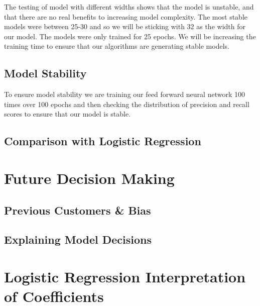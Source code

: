 \documentclass[12pt]{article}
\begin{document}
	The testing of model with different widths shows that the model is unstable, and that there are no real benefits to increasing model complexity. The most stable models were between 25-30 and so we will be sticking with 32 as the width for our model. The models were only trained for 25 epochs. We will be increasing the training time to ensure that our algorithms are generating stable models. 
	
	\subsection{Model Stability}
	
	To ensure model stability we are training our feed forward neural network 100 times over 100 epochs and then checking the distribution of precision and recall scores to ensure that our model is stable. 
	
	

	
	\subsection{Comparison with Logistic Regression}
	
	\section{Future Decision Making}
	
	\subsection{Previous Customers \& Bias}
	
	\subsection{Explaining Model Decisions}
	
	
	\appendix 
	
	\section{Logistic Regression Interpretation of Coefficients}
	
	
	
\end{document}
